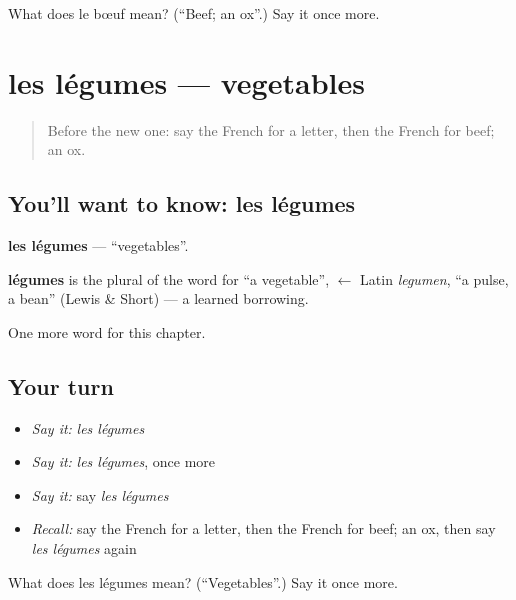 \begin{tcolorbox}[breakable,colback=teal!4,colframe=teal!35!black,title={Before you move on}]
What does le bœuf mean? (\textquotedblleft{}Beef; an ox\textquotedblright{}.) Say it once more.
\end{tcolorbox}
\section[les légumes]{les légumes — vegetables}

\label{lesson:FR-C119-legumes}



\begin{quote}
Before the new one: say the French for a letter, then the French for beef; an ox.
\end{quote}

\subsection*{You'll want to know: les légumes}
\textbf{les légumes} — \textquotedblleft{}vegetables\textquotedblright{}.

\begin{cousinweb}
\textbf{légumes} is the plural of the word for \textquotedblleft{}a vegetable\textquotedblright{}, $\leftarrow$ Latin \emph{legumen}, \textquotedblleft{}a pulse, a bean\textquotedblright{} (Lewis \& Short) — a learned borrowing.
\end{cousinweb}

\begin{grammarlens}[title={What you've built}]
One more word for this chapter.
\end{grammarlens}

\subsection*{Your turn}
\begin{itemize}
\raggedright
  \item \emph{Say it:} \emph{les légumes}
  \item \emph{Say it:} \emph{les légumes}, once more
  \item \emph{Say it:} say \emph{les légumes}
  \item \emph{Recall:} say the French for a letter, then the French for beef; an ox, then say \emph{les légumes} again
\end{itemize}

\begin{tcolorbox}[breakable,colback=teal!4,colframe=teal!35!black,title={Before you move on}]
What does les légumes mean? (\textquotedblleft{}Vegetables\textquotedblright{}.) Say it once more.
\end{tcolorbox}
